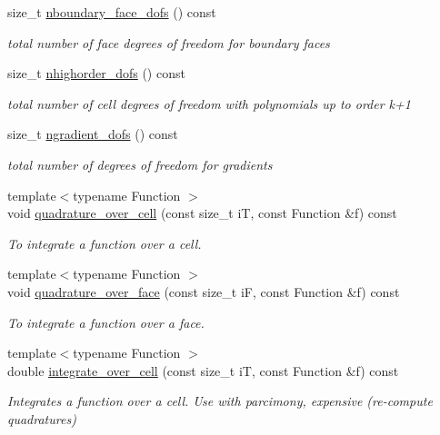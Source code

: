 \begin{DoxyCompactItemize}
size\+\_\+t \hyperlink{group__HybridCore_gaddeb59cc8b5d89525e27b2dee22eb70f}{nboundary\+\_\+face\+\_\+dofs} () const
\begin{DoxyCompactList}\small\item\em total number of face degrees of freedom for boundary faces \end{DoxyCompactList}\item 
size\+\_\+t \hyperlink{group__HybridCore_ga07b815b769bba05753666f6bf900fdc5}{nhighorder\+\_\+dofs} () const
\begin{DoxyCompactList}\small\item\em total number of cell degrees of freedom with polynomials up to order k+1 \end{DoxyCompactList}\item 
size\+\_\+t \hyperlink{group__HybridCore_ga3b0fe217b02f8b2c132f6917e2ac9900}{ngradient\+\_\+dofs} () const
\begin{DoxyCompactList}\small\item\em total number of degrees of freedom for gradients \end{DoxyCompactList}\item 
{\footnotesize template$<$typename Function $>$ }\\void \hyperlink{group__HybridCore_gaca6e3380063a17fcb76276bc8c503d5b}{quadrature\+\_\+over\+\_\+cell} (const size\+\_\+t iT, const Function \&f) const
\begin{DoxyCompactList}\small\item\em To integrate a function over a cell. \end{DoxyCompactList}\item 
{\footnotesize template$<$typename Function $>$ }\\void \hyperlink{group__HybridCore_gabba9f8c9be9f2006a441304054b955c6}{quadrature\+\_\+over\+\_\+face} (const size\+\_\+t iF, const Function \&f) const
\begin{DoxyCompactList}\small\item\em To integrate a function over a face. \end{DoxyCompactList}\item 
{\footnotesize template$<$typename Function $>$ }\\double \hyperlink{group__HybridCore_ga1cb893746a3e8bdb80500be5c9382d96}{integrate\+\_\+over\+\_\+cell} (const size\+\_\+t iT, const Function \&f) const
\begin{DoxyCompactList}\small\item\em Integrates a function over a cell. Use with parcimony, expensive (re-\/compute quadratures) \end{DoxyCompactList}\item 

\end{DoxyCompactItemize}
